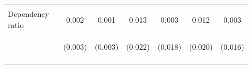 \begin{center}
\begin{tabular}{lcccccc}
\vspace{4pt} & \begin{footnotesize}[0.174]\end{footnotesize} & \begin{footnotesize}[0.026]\end{footnotesize} & \begin{footnotesize}[0.722]\end{footnotesize} & \begin{footnotesize}[0.219]\end{footnotesize} & \begin{footnotesize}[0.793]\end{footnotesize} & \begin{footnotesize}[0.247]\end{footnotesize} \\
Dependency ratio & 0.002 & 0.001 & 0.013 & 0.003 & 0.012 & 0.003 \\
 & \begin{footnotesize}(0.003)\end{footnotesize} & \begin{footnotesize}(0.003)\end{footnotesize} & \begin{footnotesize}(0.022)\end{footnotesize} & \begin{footnotesize}(0.018)\end{footnotesize} & \begin{footnotesize}(0.020)\end{footnotesize} & \begin{footnotesize}(0.016)\end{footnotesize} \\
\vspace{4pt} & \begin{footnotesize}[0.608]\end{footnotesize} & \begin{footnotesize}[0.722]\end{footnotesize} & \begin{footnotesize}[0.557]\end{footnotesize} & \begin{footnotesize}[0.854]\end{footnotesize} & \begin{footnotesize}[0.551]\end{footnotesize} & \begin{footnotesize}[0.867]\end{footnotesize} \\

\end{tabular}
\end{center}
